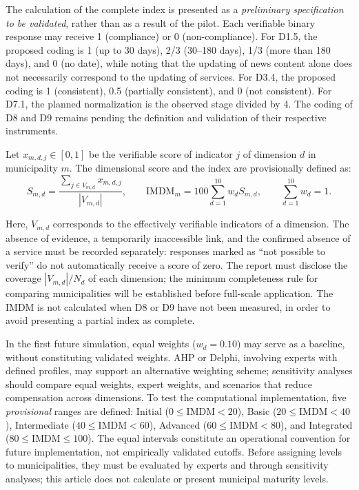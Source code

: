 \documentclass[12pt]{article}
\begin{document}
The calculation of the complete index is presented as a \textit{preliminary specification to be validated}, rather than as a result of the pilot. Each verifiable binary response may receive 1 (compliance) or 0 (non-compliance). For D1.5, the proposed coding is 1 (up to 30 days), 2/3 (30--180 days), 1/3 (more than 180 days), and 0 (no date), while noting that the updating of news content alone does not necessarily correspond to the updating of services. For D3.4, the proposed coding is 1 (consistent), 0.5 (partially consistent), and 0 (not consistent). For D7.1, the planned normalization is the observed stage divided by 4. The coding of D8 and D9 remains pending the definition and validation of their respective instruments.

Let $x_{m,d,j}\in[0,1]$ be the verifiable score of indicator $j$ of dimension $d$ in municipality $m$. The dimensional score and the index are provisionally defined as:
\begin{equation}
 S_{m,d}=\frac{\sum_{j\in V_{m,d}}x_{m,d,j}}{|V_{m,d}|},\qquad
 \mathrm{IMDM}_{m}=100\sum_{d=1}^{10}w_d S_{m,d},\qquad \sum_{d=1}^{10} w_d=1.
\end{equation}

Here, $V_{m,d}$ corresponds to the effectively verifiable indicators of a dimension. The absence of evidence, a temporarily inaccessible link, and the confirmed absence of a service must be recorded separately: responses marked as ``not possible to verify'' do not automatically receive a score of zero. The report must disclose the coverage $|V_{m,d}|/N_d$ of each dimension; the minimum completeness rule for comparing municipalities will be established before full-scale application. The IMDM is not calculated when D8 or D9 have not been measured, in order to avoid presenting a partial index as complete.

In the first future simulation, equal weights ($w_d=0.10$) may serve as a baseline, without constituting validated weights. AHP or Delphi, involving experts with defined profiles, may support an alternative weighting scheme; sensitivity analyses should compare equal weights, expert weights, and scenarios that reduce compensation across dimensions. To test the computational implementation, five \emph{provisional} ranges are defined: Initial ($0\leq\mathrm{IMDM}<20$), Basic ($20\leq\mathrm{IMDM}<40$), Intermediate ($40\leq\mathrm{IMDM}<60$), Advanced ($60\leq\mathrm{IMDM}<80$), and Integrated ($80\leq\mathrm{IMDM}\leq100$). The equal intervals constitute an operational convention for future implementation, not empirically validated cutoffs. Before assigning levels to municipalities, they must be evaluated by experts and through sensitivity analyses; this article does not calculate or present municipal maturity levels.
\end{document}
